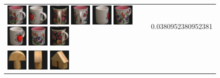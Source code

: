 {\begin{figure}[p]
\begin{tabular}{m{11cm} | m{3cm} |}
\includegraphics[width=1cm]{coil/beeld-10.eps}
\includegraphics[width=1cm]{coil/beeld-40.eps}
\includegraphics[width=1cm]{coil/beeld-65.eps}
\includegraphics[width=1cm]{coil/beeld-11.eps}
\includegraphics[width=1cm]{coil/beeld-38.eps}
\includegraphics[width=1cm]{coil/beeld-9.eps}
\includegraphics[width=1cm]{coil/beeld-39.eps}
\includegraphics[width=1cm]{coil/beeld-8.eps}
\includegraphics[width=1cm]{coil/beeld-64.eps}
& {\scriptsize 0.0380952380952381}
\\
\includegraphics[width=1cm]{coil/beeld-0.eps}
\includegraphics[width=1cm]{coil/beeld-2.eps}
\includegraphics[width=1cm]{coil/beeld-46.eps}

\end{tabular}
\end{figure}}
